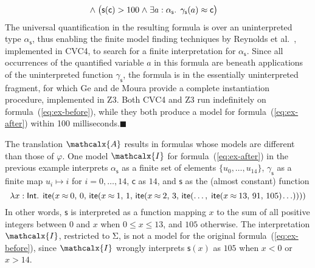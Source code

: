 \documentclass[runningheads,a4paper]{llncs}
\newcommand{\con}[1]{\mathsf{#1}}
\let\const=\con
\let\oldSigma=\Sigma
\def\Sigma{\mathrm{\oldSigma}}
\let\oldwedge=\wedge
\def\wedge{\mathrel{\oldwedge}}
\newcommand\cvc{CVC4\xspace}
\newcommand\ziii{Z3\xspace}
\newcommand{\teq}{\approx}
\newcommand{\I}{\mathcalx{I}}
\newcommand{\conv}{\mathcalx{A}}
\newcommand{\typeint}{\ty{Int}}
\newcommand\ty[1]{\con{#1}}
\newcommand{\lite}{\con{ite}}
\newcommand\concret{\gamma} %
\newcommand{\farg}[1]{\concret_{#1}}
\newcommand{\fargtype}[1]{\alpha_{#1}}
\newcommand{\rem}[1]{\textcolor{red}{[#1]}}
\newcommand{\ct}[1]{\rem{#1 --ct}}
\newcommand{\negvthinspace}{\kern-0.083333em}
\newcommand\xend{{\hfill$\scriptstyle\blacksquare$}}
\begin{document}
\begin{example}
\begin{equation}
\begin{aligned}[c]
\begin{aligned}[t]
\end{aligned}
\\[-\jot]
 & {\wedge}\; \bigl( \con{s}( \con{c} ) > 100 \wedge \exists a : {\fargtype{\con{s}}}.\;\, \farg{\con{s}}( a ) \teq \con{c} \bigr)
\end{aligned}
\end{equation}
%
The universal quantification in the resulting formula is over an uninterpreted
type $\fargtype{\con{s}}$, thus enabling the finite model finding
techniques by Reynolds et al.\ \cite{ReyEtAl-1-RR-13,reynolds-et-al-2013},
implemented in \cvc, to search for a finite interpretation for $\fargtype{\con{s}}$. 
Since all occurrences of the quantified variable $a$ in this formula are 
beneath applications of the uninterpreted function $\farg{\con{s}}$, 
the formula is in the essentially uninterpreted fragment,
for which Ge and de Moura \cite{GeDeM-CAV-09} provide 
a complete instantiation procedure, implemented in \ziii. 
Both
\cvc and \ziii run indefinitely on formula~(\ref{eq:ex-before}), 
while they both produce a model for formula~(\ref{eq:ex-after}) 
within 100 milliseconds.\xend
\end{example}

The translation $\conv$ results in formulas whose models are different than those of $\varphi$.
One model $\I$ for formula~(\ref{eq:ex-after}) in the previous example interprets
$\fargtype{\con{s}}$ as a finite set of elements $\{ u_0, \ldots, u_{14} \}$,
$\farg{\con{s}}$ as a finite map $u_i \mapsto i$ for $i = 0, \ldots, 14$,
$\con{c}$ as $14$,
and $\con{s}$ as the (almost constant) function
%
\begin{equation} \label{eq:approx-interp}
\lambda x : \typeint.\;\, \lite( x \mathbin{\teq} 0,\, 0,\,
  \lite( x \mathbin{\teq} 1,\, 1,\,
    \lite( x \mathbin{\teq} 2,\, 3,\,
      \lite(\ldots,\; \lite( x \mathbin{\teq} 13,\, 91,\, 105 )\negvthinspace \ldots ))))
\end{equation}
%
In other words, $\const{s}$ is interpreted as a function mapping $x$ to the sum
of all positive integers between $0$ and $x$ when $0 \leq x \leq 13$, and $105$
otherwise.
The interpretation $\I$, restricted to $\Sigma$, is {not} a model for the original formula~(\ref{eq:ex-before}),
since $\I$ wrongly interprets $\con{s}( x )$ as $105$ when $x < 0$ or $x > 14$.
\end{document}
